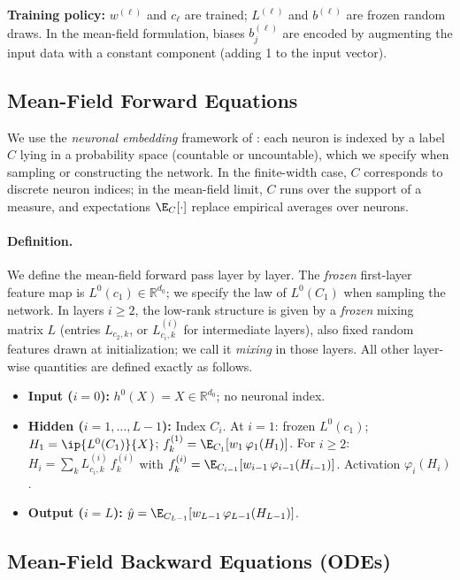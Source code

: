 \documentclass[nohyperref]{article}
\theoremstyle{plain}
\theoremstyle{definition}
\theoremstyle{remark}
\begin{document}
\textbf{Training policy:} $w^{(\ell)}$ and $c_{\ell}$ are trained; $L^{(\ell)}$ and $b^{(\ell)}$ are frozen random draws. In the mean-field formulation, biases $b^{(\ell)}_j$ are encoded by augmenting the input data with a constant component (adding 1 to the input vector).

\subsection{Mean-Field Forward Equations}
\label{subsec:forward-equations}

We use the \emph{neuronal embedding} framework of \cite{nguyen2023rigorousframeworkmeanfield}: each neuron is indexed by a label $C$ lying in a probability space (countable or uncountable), which we specify when sampling or constructing the network. In the finite-width case, $C$ corresponds to discrete neuron indices; in the mean-field limit, $C$ runs over the support of a measure, and expectations $\E_C[\cdot]$ replace empirical averages over neurons.

\paragraph{Definition.}
We define the mean-field forward pass layer by layer. The \emph{frozen} first-layer feature map is $L^0(c_1) \in \mathbb{R}^{d_0}$; we specify the law of $L^0(C_1)$ when sampling the network. In layers $i \ge 2$, the low-rank structure is given by a \emph{frozen} mixing matrix $L$ (entries $L_{c_2,k}$, or $L^{(i)}_{c_i,k}$ for intermediate layers), also fixed random features drawn at initialization; we call it \emph{mixing} in those layers. All other layer-wise quantities are defined exactly as follows.

\begin{itemize}
\item \textbf{Input ($i=0$):} $h^0(X)=X \in \mathbb{R}^{d_0}$; no neuronal index.
\item \textbf{Hidden ($i=1,\ldots,L-1$):} Index $C_i$. At $i=1$: frozen $L^0(c_1)$; $H_1=\ip{L^0(C_1)}{X}$; $f_k^{(1)}=\E_{C_1}[w_1\,\varphi_1(H_1)]$. For $i\ge 2$: $H_i=\sum_k L^{(i)}_{c_i,k}\,f_k^{(i)}$ with $f_k^{(i)}=\E_{C_{i-1}}[w_{i-1}\,\varphi_{i-1}(H_{i-1})]$. Activation $\varphi_i(H_i)$.
\item \textbf{Output ($i=L$):} $\hat{y}=\E_{C_{L-1}}[w_{L-1}\,\varphi_{L-1}(H_{L-1})]$.
\end{itemize}
\subsection{Mean-Field Backward Equations (ODEs)}
\label{sec:derivation}
\end{document}
